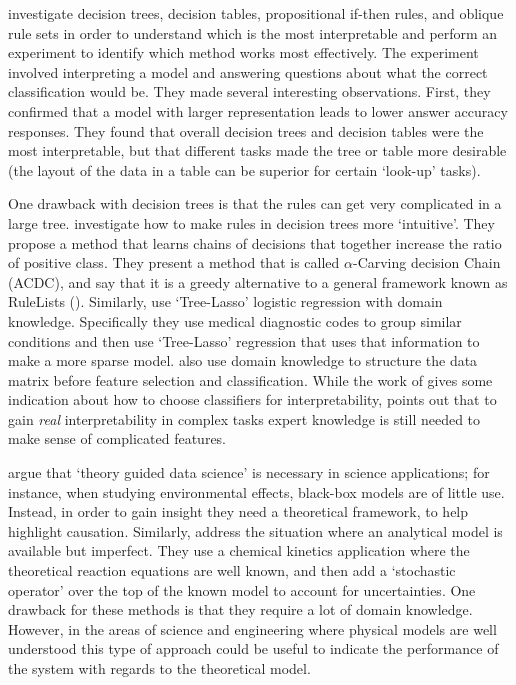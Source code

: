     \citet{Huysmans2011-th} investigate decision trees, decision tables, propositional if-then rules, and oblique rule sets in order to understand which is the most interpretable and perform an experiment to identify which method works most effectively. The experiment involved interpreting a model and answering questions about what the correct classification would be. They made several interesting observations. First, they confirmed that a model with larger representation leads to lower answer accuracy responses. They found that overall decision trees and decision tables were the most interpretable, but that different tasks made the tree or table more desirable (the layout of the data in a table can be superior for certain `look-up' tasks). 

    One drawback with decision trees is that the rules can get very complicated in a large tree. \citet{Park2016-ld} investigate how to make rules in decision trees more `intuitive'. They propose a method that learns chains of decisions that together increase the ratio of positive class. They present a method that is called $\alpha$-Carving decision Chain (ACDC), and say that it is a greedy alternative to a general framework known as RuleLists (\citet{Wang2015-ww}). 
    Similarly, \citet{Jovanovic2016-gw} use `Tree-Lasso' logistic regression with domain knowledge. Specifically they use medical diagnostic codes to group similar conditions and then use `Tree-Lasso' regression that uses that information to make a more sparse model. \citet{Zycinski2012-jj} also use domain knowledge to structure the data matrix before feature selection and classification. While the work of \citeauthor{Huysmans2011-th} gives some indication about how to choose classifiers for interpretability, \citeauthor{Park2016-ld} points out that to gain \emph{real} interpretability in complex tasks expert knowledge is still needed to make sense of complicated features.

    \citet{Faghmous2014-og} argue that `theory guided data science' is necessary in science applications; for instance, when studying environmental effects, black-box models are of little use. Instead, in order to gain insight they need a theoretical framework, to help highlight causation. Similarly, \citet{Morrison2016-fz} address the situation where an analytical model is available but imperfect. They use a chemical kinetics application where the theoretical reaction equations are well known, and then add a `stochastic operator' over the top of the known model to account for uncertainties. One drawback for these methods is that they require a lot of domain knowledge. However, in the areas of science and engineering where physical models are well understood this type of approach could be useful to indicate the performance of the system with regards to the theoretical model.


